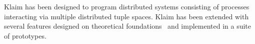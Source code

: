 
Klaim has been designed to program distributed systems consisting of
processes interacting via multiple distributed tuple spaces.
%
Klaim has been extended with several features designed on theoretical
foundations~\cite{klaim} and implemented in a suite of prototypes.



